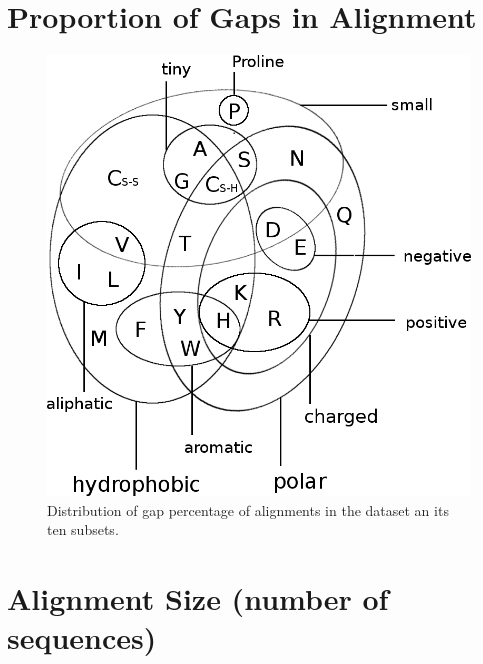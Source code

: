 \documentclass[12pt,a4paper,twoside]{book}
\theoremstyle{definition}
\theoremstyle{definition}
\theoremstyle{remark}
\begin{document}
\section{Proportion of Gaps in
Alignment}\label{proportion-of-gaps-in-alignment}




\begin{figure}
\includegraphics[width=1\linewidth]{img/amino_acid_physico_chemical_properties_venn_diagramm} \caption{Distribution of gap percentage of alignments in the
dataset an its ten subsets.}\label{fig:dataset-gaps}
\end{figure}

\section{Alignment Size (number of
sequences)}\label{alignment-size-number-of-sequences}
\end{document}
